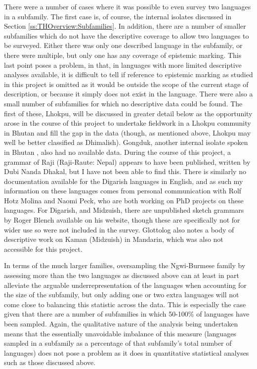 There were a number of cases where it was possible to even survey two languages in a subfamily. The first case is, of course, the internal isolates discussed in Section \ref{ss:THOverview:Subfamilies}. In addition, there are a number of smaller subfamilies which do not have the descriptive coverage to allow two languages to be surveyed. Either there was only one described language in the subfamily, or there were multiple, but only one has any coverage of epistemic marking. This last point poses a problem, in that, in languages with more limited descriptive analyses available, it is difficult to tell if reference to epistemic marking as studied in this project is omitted as it would be outside the scope of the current stage of description, or because it simply does not exist in the language. There were also a small number of subfamilies for which no descriptive data could be found. The first of these, Lhokpu, will be discussed in greater detail below as the opportunity arose in the course of this project to undertake fieldwork in a Lhokpu community in Bhutan and fill the gap in the data (though, as mentioned above, Lhokpu may well be better classified as Dhimalish). Gongduk, another internal isolate spoken in Bhutan \cite{VanDriem2001b}, also had no available data. During the course of this project, a grammar of Raji (Raji-Raute: Nepal) appears to have been published, written by Dubi Nanda Dhakal, but I have not been able to find this. There is similarly no documentation available for the Digarish languages in English, and as such my information on these languages comes from personal communication with Rolf Hotz Molina and Naomi Peck, who are both working on PhD projects on these languages. For Digarish, and Midzuish, there are unpublished sketch grammars by Roger Blench available on his website, though these are specifically not for wider use so were not included in the survey. Glottolog also notes a body of descriptive work on Kaman (Midzuish) in Mandarin, which was also not accessible for this project.

In terms of the much larger families, oversampling the Ngwi-Burmese family by assessing more than the two languages as discussed above can at least in part alleviate the arguable underrepresentation of the languages when accounting for the size of the subfamily, but only adding one or two extra languages will not come close to balancing this statistic across the data. This is especially the case given that there are a number of subfamilies in which 50-100\% of languages have been sampled. Again, the qualitative nature of the analysis being undertaken means that the essentially unavoidable imbalance of this measure (languages sampled in a subfamily as a percentage of that subfamily's total number of languages) does not pose a problem as it does in quantitative statistical analyses such as those discussed above.

